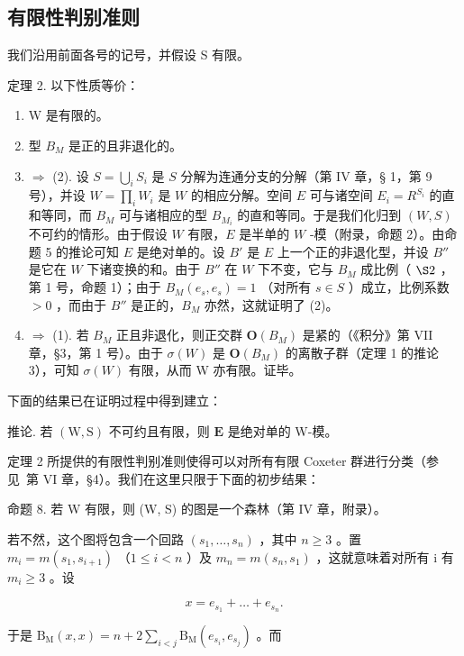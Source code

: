 \subsection{有限性判别准则}

我们沿用前面各号的记号，并假设 S 有限。

定理 2. 以下性质等价：

\begin{enumerate}
\def\labelenumi{(\arabic{enumi})}
\item
  W 是有限的。
\item
  型 \(B_{M}\) 是正的且非退化的。
\item
  \(\Longrightarrow\) (2). 设 \(S = \bigcup_{i} S_{i}\) 是 \(S\) 分解为连通分支的分解（第 IV 章，§ 1，第 9 号），并设 \(W = \prod_{i} W_{i}\) 是 \(W\) 的相应分解。空间 \(E\) 可与诸空间 \(E_{i} = R^{S_{i}}\) 的直和等同，而 \(B_{M}\) 可与诸相应的型 \(B_{M_{i}}\) 的直和等同。于是我们化归到 \((W, S)\) 不可约的情形。由于假设 \(W\) 有限，\(E\) 是半单的 \(W\) -模（附录，命题 2）。由命题 5 的推论可知 \(E\) 是绝对单的。设 \(B'\) 是 \(E\) 上一个正的非退化型，并设 \(B''\) 是它在 \(W\) 下诸变换的和。由于 \(B''\) 在 \(W\) 下不变，它与 \(B_{M}\) 成比例（ \(\S 2\) ，第 1 号，命题 1）；由于 \(B_{M}(e_{s}, e_{s}) = 1\) （对所有 \(s \in S\) ）成立，比例系数 \(>0\) ，而由于 \(B''\) 是正的，\(B_{M}\) 亦然，这就证明了 (2)。
\item
  \(\Longrightarrow\) (1). 若 \(B_{M}\) 正且非退化，则正交群 \(\mathbf{O}(B_{M})\) 是紧的（《积分》第 VII 章，§3，第 1 号）。由于 \(\sigma(W)\) 是 \(\mathbf{O}(B_{M})\) 的离散子群（定理 1 的推论 3），可知 \(\sigma(W)\) 有限，从而 W 亦有限。证毕。
\end{enumerate}

下面的结果已在证明过程中得到建立：

推论. 若 \((\mathrm{W},\mathrm{S})\) 不可约且有限，则 \(\mathbf{E}\) 是绝对单的 W-模。

定理 2 所提供的有限性判别准则使得可以对所有有限 Coxeter 群进行分类（参见~第 VI 章，§4）。我们在这里只限于下面的初步结果：

命题 8. 若 W 有限，则 (W, S) 的图是一个森林（第 IV 章，附录）。

若不然，这个图将包含一个回路 \((s_{1},\ldots,s_{n})\) ，其中 \(n\geqslant3\) 。置 \(m_{i}=m(s_{1},s_{i+1})\) （\(1\leqslant i<n\) ）及 \(m_{n}=m(s_{n},s_{1})\) ，这就意味着对所有 i 有 \(m_{i}\geqslant3\) 。设

\[
x = e _ {s _ {1}} + \dots + e _ {s _ {n}}.
\]

于是 \(\mathrm{B_M}(x,x) = n + 2\sum_{i < j}\mathrm{B_M}(e_{s_i},e_{s_j})\) 。而


